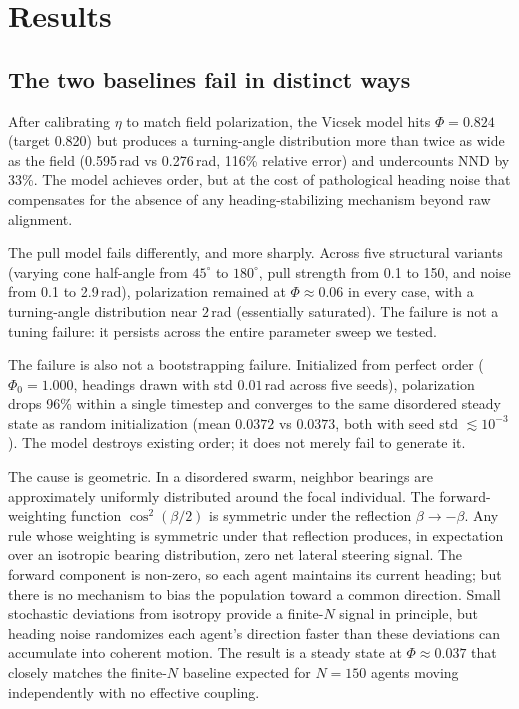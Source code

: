 \documentclass[11pt]{article}
\begin{document}
\section{Results}
\label{sec:results}

\subsection{The two baselines fail in distinct ways}

After calibrating $\eta$ to match field polarization, the Vicsek model
hits $\Phi = 0.824$ (target 0.820) but produces a turning-angle
distribution more than twice as wide as the field
(0.595\,rad vs 0.276\,rad, 116\% relative error) and undercounts NND by
33\%. The model achieves order, but at the cost of pathological
heading noise that compensates for the absence of any heading-stabilizing
mechanism beyond raw alignment.

The pull model fails differently, and more sharply. Across five
structural variants (varying cone half-angle from $45^\circ$ to
$180^\circ$, pull strength from 0.1 to 150, and noise from 0.1 to
2.9\,rad), polarization remained at $\Phi \approx 0.06$ in every case,
with a turning-angle distribution near $2\,$rad (essentially saturated).
The failure is not a tuning failure: it persists across the entire
parameter sweep we tested.

The failure is also not a bootstrapping failure. Initialized from
perfect order ($\Phi_0 = 1.000$, headings drawn with std $0.01\,$rad
across five seeds), polarization drops 96\% within a single timestep
and converges to the same disordered steady state as random
initialization (mean $0.0372$ vs $0.0373$, both with seed std $\lesssim
10^{-3}$). The model destroys existing order; it does not merely fail to
generate it.

The cause is geometric. In a disordered swarm, neighbor bearings are
approximately uniformly distributed around the focal individual. The
forward-weighting function $\cos^2(\beta/2)$ is symmetric under the
reflection $\beta \to -\beta$. Any rule whose weighting is symmetric
under that reflection produces, in expectation over an isotropic bearing
distribution, zero net lateral steering signal. The forward component
is non-zero, so each agent maintains its current heading; but there is
no mechanism to bias the population toward a common direction. Small
stochastic deviations from isotropy provide a finite-$N$ signal in
principle, but heading noise randomizes each agent's direction faster
than these deviations can accumulate into coherent motion. The result is
a steady state at $\Phi \approx 0.037$ that closely matches the
finite-$N$ baseline expected for $N=150$ agents moving independently
with no effective coupling.
\end{document}
